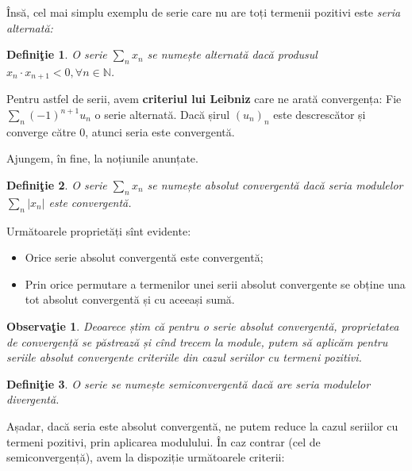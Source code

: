 \documentclass[11pt,a4paper]{article}
\newcommand\NN{\mathbb{N}}
\theoremstyle{dotless}
\theoremstyle{dotlessdr}
\newtheorem{definition}{Defini\c{t}ie}[section]
\newtheorem{remark}{Observa\c{t}ie}[section]
\begin{document}
Însă, cel mai simplu exemplu de serie care nu are toți termenii pozitivi este
\emph{seria alternată:}

\begin{definition}\label{def:serie-alt}
  O serie $\sum_n x_n$ se numește \emph{alternată} dacă produsul
  $x_n \cdot x_{n+1} < 0, \forall n \in \NN$.
\end{definition}

Pentru astfel de serii, avem \textbf{criteriul lui Leibniz} care ne arată
convergența: Fie $\sum_n (-1)^{n+1} u_n$ o serie alternată. Dacă șirul
$(u_n)_n$ este descrescător și converge către $0$, atunci seria este
convergentă.

Ajungem, în fine, la noțiunile anunțate.

\begin{definition}\label{def:abs-conv}
  O serie $\sum_n x_n$ se numește \emph{absolut convergentă} dacă seria
  modulelor $\sum_n |x_n|$ este convergentă.
\end{definition}

Următoarele proprietăți sînt evidente:
\begin{itemize}
  \item Orice serie absolut convergentă este convergentă;
  \item Prin orice permutare a termenilor unei serii absolut convergente se
    obține una tot absolut convergentă și cu aceeași sumă.
\end{itemize}

\begin{remark}\label{rk:abs-conv-poz}
  Deoarece știm că pentru o serie absolut convergentă, proprietatea de
  convergență se păstrează și cînd trecem la module, putem să aplicăm pentru
  seriile absolut convergente criteriile din cazul seriilor cu termeni pozitivi.
\end{remark}


\begin{definition}\label{def:semiconv}
  O serie se numește \emph{semiconvergentă} dacă are seria modulelor divergentă.
\end{definition}

Așadar, dacă seria este absolut convergentă, ne putem reduce la cazul seriilor
cu termeni pozitivi, prin aplicarea modulului. În caz contrar (cel de semiconvergență),
avem la dispoziție următoarele criterii:
\end{document}
